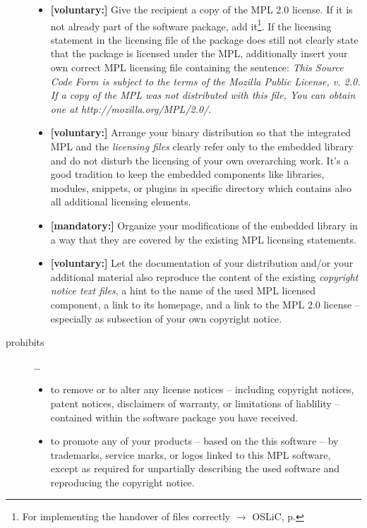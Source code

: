\begin{description}
\begin{itemize}
  \item \textbf{[voluntary:]} Give the recipient a copy of the MPL 2.0 license.
  If it is not already part of the software package, add it\footnote{For
  implementing the handover of files correctly $\rightarrow$ OSLiC, p.
  \pageref{DistributingFilesHint}}. If the licensing statement in the licensing
  file of the package does still not clearly state that the package is licensed
  under the MPL, additionally insert your own correct MPL licensing file
  containing the sentence: \emph{This Source Code Form is subject to the terms
  of the Mozilla Public License, v. 2.0. If a copy of the MPL was not
  distributed with this file, You can obtain one at
  http://mozilla.org/MPL/2.0/}.

  \item \textbf{[voluntary:]} Arrange your binary distribution so that the
  integrated MPL and the \emph{licensing files} clearly refer only to the
  embedded library and do not disturb the licensing of your own overarching
  work. It's a good tradition to keep the embedded components like libraries,
  modules, snippets, or plugins in specific directory which contains also all
  additional licensing elements.
  
  \item \textbf{[mandatory:]} Organize your modifications of the embedded
  library in a way that they are covered by the existing MPL licensing
  statements. 
  
  \item \textbf{[voluntary:]} Let the documentation of your distribution and/or
  your additional material  also reproduce the content of the existing
  \emph{copyright notice text files}, a hint to the name of the used MPL
  licensed component, a link to its homepage, and a link to the MPL 2.0 license
  -- especially as subsection of your own copyright notice.
  
\end{itemize}

\item[prohibits] \ldots
\begin{itemize}
  \item to remove or to alter any license notices -- including copyright
  notices, patent notices, disclaimers of warranty, or limitations of liablility
  -- contained within the software package you have received.
  \item to promote any of your products -- based on the this software -- by
  trademarks, service marks, or logos linked to this MPL software, except as
  required for unpartially describing the used software and reproducing the
  copyright notice.
\end{itemize}

\end{description}


